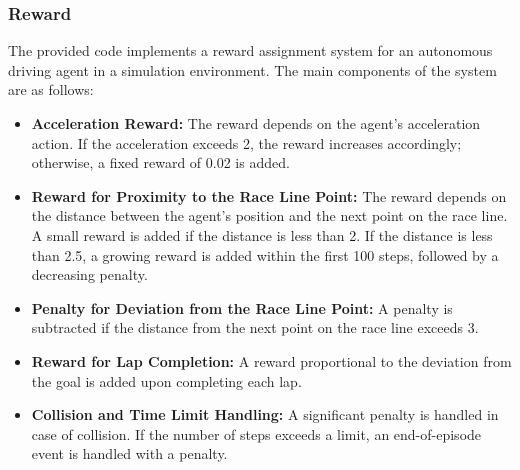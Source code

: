 \documentclass[conference]{IEEEtran}
\begin{document}




%
%
%
\subsubsection{Reward}
The provided code implements a reward assignment system for an autonomous driving agent in a simulation environment.
%
The main components of the system are as follows:

\begin{itemize}
    \item \textbf{Acceleration Reward:}
    The reward depends on the agent's acceleration action.
    If the acceleration exceeds 2, the reward increases accordingly; otherwise, a fixed reward of 0.02 is added.

    \item \textbf{Reward for Proximity to the Race Line Point:}
    The reward depends on the distance between the agent's position and the next point on the race line.
    A small reward is added if the distance is less than 2.
    If the distance is less than 2.5, a growing reward is added within the first 100 steps, followed by a decreasing penalty.

    \item \textbf{Penalty for Deviation from the Race Line Point:}
    A penalty is subtracted if the distance from the next point on the race line exceeds 3.

    \item \textbf{Reward for Lap Completion:}
    A reward proportional to the deviation from the goal is added upon completing each lap.

    \item \textbf{Collision and Time Limit Handling:}
    A significant penalty is handled in case of collision.
    If the number of steps exceeds a limit, an end-of-episode event is handled with a penalty.

\end{itemize}
\end{document}
